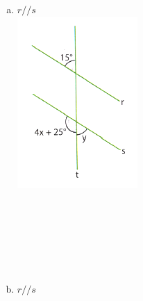 \documentclass[a4paper,14pt]{article}
\begin{document}
\begin{multicols}{2}
\begin{enumerate}
\begin{enumerate}[a)]
				\item $r // s$ \\
				\includegraphics[width=1\linewidth]{6FMA144_imagens/imagem4} \\\\\\\\\\\\\\
				\item $r // s$ \\

\end{enumerate}
\end{enumerate}
\end{multicols}
\end{document}
